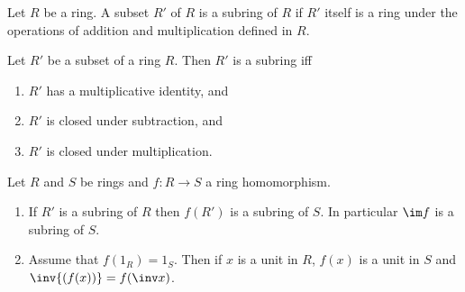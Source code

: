 \documentclass{article}
\begin{document}
\begin{definition}
    Let $R$ be a ring. A subset $R'$ of $R$ is a subring of $R$ if $R'$ itself 
    is a ring under the operations of addition and multiplication defined in $R$.
\end{definition}

\begin{proposition}[Notes 3.4.26]
    Let $R'$ be a subset of a ring $R$. Then $R'$ is a subring iff 
    \begin{enumerate}
        \item $R'$ has a multiplicative identity, and 
        \item $R'$ is closed under subtraction, and 
        \item $R'$ is closed under multiplication.
    \end{enumerate} 
\end{proposition}

\begin{proposition}[Notes 3.4.28]
    Let $R$ and $S$ be rings and $f:R\to S$ a ring homomorphism.
    \begin{enumerate}
        \item If $R'$ is a subring of $R$ then $f(R')$ is a subring of $S$. In particular
            $\im f$ is a subring of $S$.
        \item Assume that $f(1_R)=1_S$. Then if $x$ is a unit in $R$, $f(x)$ is a unit 
            in $S$ and $\inv{(f(x))} = f(\inv x)$.
    \end{enumerate} 
\end{proposition}
\end{document}
